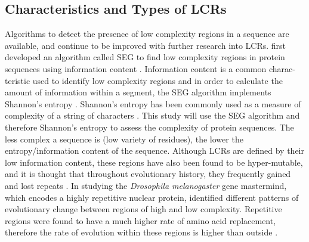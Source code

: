 \documentclass[10pt]{article}
\newcommand{\dmlong}{\textit{Drosophila melanogaster}\xspace}
\begin{document}
\subsection{Characteristics and Types of LCRs}
Algorithms to detect the presence of low complexity regions in a sequence are available, and continue to be improved
with further research into LCRs. \citet{wootton1993statistics} first developed an algorithm called SEG to find low complexity
regions in protein sequences using information content \citep{huntley2002simple}. Information content is a common charac-
teristic used to identify low complexity regions and in order to calculate the amount of information within a segment, the SEG
algorithm implements Shannon’s entropy \citep{wootton1993statistics,battistuzzi2016profiles}. Shannon’s entropy \citep{shannon1948mathematical} has been commonly used as a measure of complexity of a string of characters \citep{wootton1993statistics, coletta2010low, battistuzzi2016profiles}. This study will use the SEG algorithm and therefore Shannon’s entropy to assess the complexity of protein sequences. The less complex a sequence is (low variety of residues), the lower the entropy/information content of the sequence. Although LCRs are defined by their low information content, these regions have also been found to be hyper-mutable, and it is thought that throughout evolutionary history, they frequently gained and lost repeats \citep{kruglyak1998equilibrium, marcotte1999census}. In studying the \dmlong gene mastermind, which encodes a highly repetitive nuclear protein, \citet{newfeld1991interspecific} identified different patterns of evolutionary change between regions of high and low complexity. Repetitive regions were found to have a much higher rate of amino acid replacement, therefore the rate of evolution within these regions is higher than outside \citep{newfeld1991interspecific, huntley2000evolution}.
\end{document}
